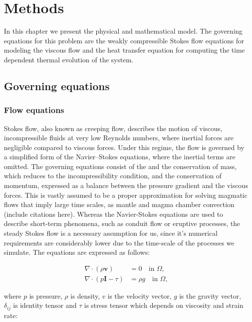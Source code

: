 \chapter{Methods}
In this chapter we present the physical and mathematical model. The governing equations for this problem are the weakly compressible Stokes flow equations for modeling the viscous flow and the heat transfer equation for computing the time dependent thermal evolution of the system.%


\section{Governing equations}
\subsection{Flow equations}
 Stokes flow, also known as creeping flow, describes the motion of viscous, incompressible fluids at very low Reynolds numbers, where inertial forces are negligible compared to viscous forces. Under this regime, the flow is governed by a simplified form of the Navier–Stokes equations, where the inertial terms are omitted. The governing equations consist of the and the conservation of mass, which reduces to the incompressibility condition, and the conservation of momentum, expressed as a balance between the pressure gradient and the viscous forces.
 This is vastly assumed to be a proper approximation for solving magmatic flows that imply large time scales, as mantle and magma chamber convection (include citations here). Whereas the Navier-Stokes equations are used to describe short-term phenomena, such as conduit flow or eruptive processes, the steady Stokes flow is a necessary assumption for us, since it's numerical requirements are considerably lower due to the time-scale of the processes we simulate. The equations are expressed as follows:

 \begin{align}
\nabla \cdot (\rho \mathbf{v}) &= 0 \quad \text{in } \Omega, \\
\nabla \cdot (p\boldsymbol{I} - \tau) &= \rho g\quad \text{in } \Omega,
\end{align}

where $p$ is pressure, $\rho$ is density, $v$ is the velocity vector, $g$ is the gravity vector, $\delta_{ij}$  is identity tensor and $\tau$ is stress tensor which depends on viscosity and strain rate:

